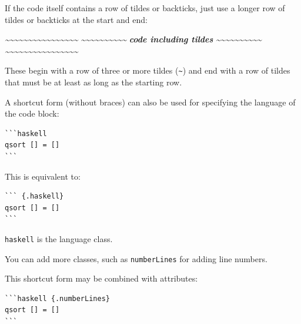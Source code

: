 \documentclass[
]{book}
\newenvironment{Shaded}{\begin{snugshade}}{\end{snugshade}}
\newcommand{\InformationTok}[1]{\textcolor[rgb]{0.56,0.35,0.01}{\textbf{\textit{#1}}}}
\theoremstyle{definition}
\theoremstyle{definition}
\theoremstyle{definition}
\theoremstyle{definition}
\theoremstyle{remark}
\begin{document}
If the code itself contains a row of tildes or backticks, just use a longer row of tildes or backticks at the start and end:

\begin{Shaded}
\begin{Highlighting}[]
\InformationTok{\textasciitilde{}\textasciitilde{}\textasciitilde{}\textasciitilde{}\textasciitilde{}\textasciitilde{}\textasciitilde{}\textasciitilde{}\textasciitilde{}\textasciitilde{}\textasciitilde{}\textasciitilde{}\textasciitilde{}\textasciitilde{}\textasciitilde{}\textasciitilde{}}
\InformationTok{\textasciitilde{}\textasciitilde{}\textasciitilde{}\textasciitilde{}\textasciitilde{}\textasciitilde{}\textasciitilde{}\textasciitilde{}\textasciitilde{}\textasciitilde{}}
\InformationTok{code including tildes}
\InformationTok{\textasciitilde{}\textasciitilde{}\textasciitilde{}\textasciitilde{}\textasciitilde{}\textasciitilde{}\textasciitilde{}\textasciitilde{}\textasciitilde{}\textasciitilde{}}
\InformationTok{\textasciitilde{}\textasciitilde{}\textasciitilde{}\textasciitilde{}\textasciitilde{}\textasciitilde{}\textasciitilde{}\textasciitilde{}\textasciitilde{}\textasciitilde{}\textasciitilde{}\textasciitilde{}\textasciitilde{}\textasciitilde{}\textasciitilde{}\textasciitilde{}}
\end{Highlighting}
\end{Shaded}

These begin with a row of three or more tildes (\texttt{\textasciitilde{}}) and end with a row of tildes that must be at least as long as the starting row.

A shortcut form (without braces) can also be used for specifying the language of the code block:

\begin{verbatim}
```haskell
qsort [] = []
```
\end{verbatim}

This is equivalent to:

\begin{verbatim}
``` {.haskell}
qsort [] = []
```
\end{verbatim}

\texttt{haskell} is the language class.

You can add more classes, such as \texttt{numberLines} for adding line numbers.

This shortcut form may be combined with attributes:

\begin{verbatim}
```haskell {.numberLines}
qsort [] = []
```
\end{verbatim}
\end{document}
